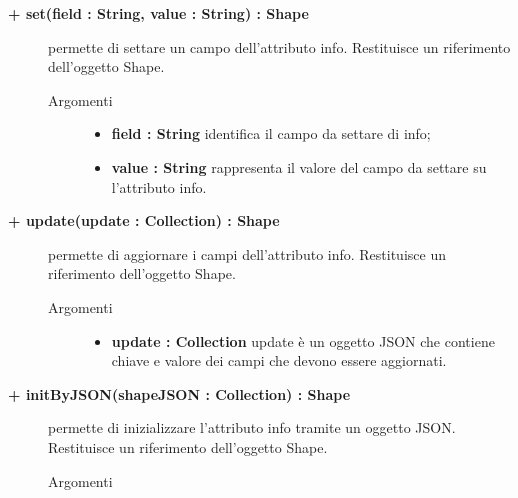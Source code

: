 \begin{description}
\begin{description}
\end{description}


		\begin{description}
		\item[\textbf{\color{blue}+ set(field : String, value : String) : Shape			}] \hfill
			permette di settare un campo dell'attributo info. Restituisce un riferimento dell'oggetto Shape.
			
		\begin{description}
			\item[Argomenti] \hfill
				\begin{itemize}
				
					\item \textbf{field : String			} \hfill
					identifica il campo da settare di info;
					\item \textbf{value : String			} \hfill
					rappresenta il valore del campo da settare su l'attributo info.
				\end{itemize}
		\end{description}

\end{description}

\begin{description}
		\item[\textbf{\color{blue}+ update(update : Collection) : Shape			}] \hfill
			permette di aggiornare i campi dell'attributo info. Restituisce un riferimento dell'oggetto Shape.
			
		\begin{description}
			\item[Argomenti] \hfill
				\begin{itemize}
				
					\item \textbf{update : Collection			} \hfill
					update è un oggetto JSON che contiene chiave e valore dei campi che devono essere aggiornati. 
				\end{itemize}
		\end{description}

\end{description}

\begin{description}
		\item[\textbf{\color{blue}+ initByJSON(shapeJSON : Collection) : Shape			}] \hfill
			permette di inizializzare l'attributo info tramite un oggetto JSON.  
			Restituisce un riferimento dell'oggetto Shape.
		\begin{description}
			\item[Argomenti] \hfill
				\begin{itemize}
				

\end{itemize}
\end{description}
\end{description}
\end{description}
